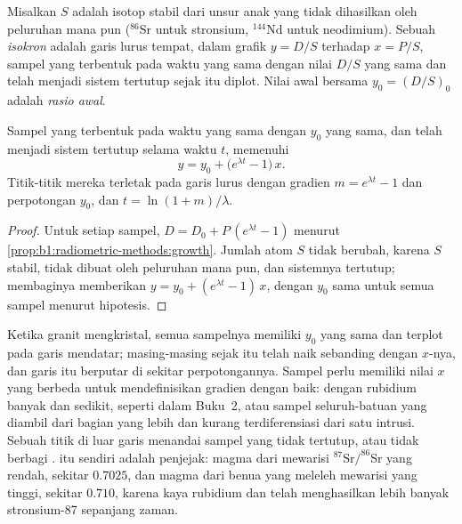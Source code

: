 \begin{definition}\label{def:b1:radiometric-methods:isochron}
Misalkan $S$ adalah isotop stabil dari unsur anak yang tidak dihasilkan oleh peluruhan mana pun ($^{86}\mathrm{Sr}$ untuk stronsium, $^{144}\mathrm{Nd}$ untuk neodimium). Sebuah \emph{isokron} adalah garis lurus tempat, dalam grafik $y = D/S$ terhadap $x = P/S$, sampel yang terbentuk pada waktu yang sama dengan nilai $D/S$ yang sama dan telah menjadi sistem tertutup sejak itu diplot. Nilai awal bersama $y_0 = (D/S)_0$ adalah \emph{rasio awal}.
\end{definition}

\begin{theorem}[Isokron]\label{thm:b1:radiometric-methods:isochron}
Sampel yang terbentuk pada waktu yang sama dengan  $y_0$ yang sama, dan telah menjadi sistem tertutup selama waktu $t$, memenuhi
\[
  y = y_0 + \bigl(e^{\lambda t} - 1\bigr)\,x .
\]
Titik-titik mereka terletak pada garis lurus dengan gradien $m = e^{\lambda t} - 1$ dan perpotongan $y_0$, dan $t = \ln(1+m)/\lambda$.
\end{theorem}

\begin{proof}
Untuk setiap sampel, $D = D_0 + P\,(e^{\lambda t} - 1)$ menurut \cref{prop:b1:radiometric-methods:growth}. Jumlah atom $S$ tidak berubah, karena $S$ stabil, tidak dibuat oleh peluruhan mana pun, dan sistemnya tertutup; membaginya memberikan $y = y_0 + (e^{\lambda t} - 1)\,x$, dengan $y_0$ sama untuk semua sampel menurut hipotesis.
\end{proof}

Ketika granit mengkristal, semua sampelnya memiliki $y_0$ yang sama dan terplot pada garis mendatar; masing-masing sejak itu telah naik sebanding dengan $x$-nya, dan garis itu berputar di sekitar perpotongannya. Sampel perlu memiliki nilai $x$ yang berbeda untuk mendefinisikan gradien dengan baik:  dengan rubidium banyak dan sedikit, seperti dalam Buku~2, atau sampel seluruh-batuan yang diambil dari bagian yang lebih dan kurang terdiferensiasi dari satu intrusi. Sebuah titik di luar garis menandai sampel yang tidak tertutup, atau tidak berbagi .  itu sendiri adalah penjejak: magma dari  mewarisi $^{87}\mathrm{Sr}/^{86}\mathrm{Sr}$ yang rendah, sekitar $0.7025$, dan magma dari  benua yang meleleh mewarisi yang tinggi, sekitar $0.710$, karena  kaya rubidium dan telah menghasilkan lebih banyak stronsium-87 sepanjang zaman.

